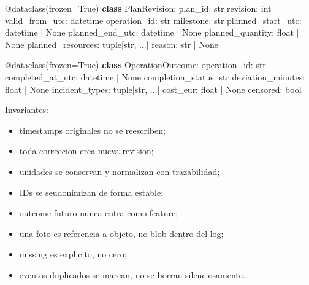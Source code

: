 \documentclass[
  spanish,
  10pt,
  a4paper,
]{article}
\newenvironment{Shaded}{}{}
\newcommand{\AttributeTok}[1]{\textcolor[rgb]{0.49,0.56,0.16}{#1}}
\newcommand{\BuiltInTok}[1]{\textcolor[rgb]{0.00,0.50,0.00}{#1}}
\newcommand{\KeywordTok}[1]{\textcolor[rgb]{0.00,0.44,0.13}{\textbf{#1}}}
\newcommand{\NormalTok}[1]{#1}
\newcommand{\OperatorTok}[1]{\textcolor[rgb]{0.40,0.40,0.40}{#1}}
\newcommand{\VariableTok}[1]{\textcolor[rgb]{0.10,0.09,0.49}{#1}}
\providecommand{\tightlist}{%
  \setlength{\itemsep}{0pt}\setlength{\parskip}{0pt}}
\begin{document}
\begin{Shaded}
\begin{Highlighting}[]
\AttributeTok{@dataclass}\NormalTok{(frozen}\OperatorTok{=}\VariableTok{True}\NormalTok{)}
\KeywordTok{class}\NormalTok{ PlanRevision:}
\NormalTok{    plan\_id: }\BuiltInTok{str}
\NormalTok{    revision: }\BuiltInTok{int}
\NormalTok{    valid\_from\_utc: datetime}
\NormalTok{    operation\_id: }\BuiltInTok{str}
\NormalTok{    milestone: }\BuiltInTok{str}
\NormalTok{    planned\_start\_utc: datetime }\OperatorTok{|} \VariableTok{None}
\NormalTok{    planned\_end\_utc: datetime }\OperatorTok{|} \VariableTok{None}
\NormalTok{    planned\_quantity: }\BuiltInTok{float} \OperatorTok{|} \VariableTok{None}
\NormalTok{    planned\_resources: }\BuiltInTok{tuple}\NormalTok{[}\BuiltInTok{str}\NormalTok{, ...]}
\NormalTok{    reason: }\BuiltInTok{str} \OperatorTok{|} \VariableTok{None}

\AttributeTok{@dataclass}\NormalTok{(frozen}\OperatorTok{=}\VariableTok{True}\NormalTok{)}
\KeywordTok{class}\NormalTok{ OperationOutcome:}
\NormalTok{    operation\_id: }\BuiltInTok{str}
\NormalTok{    completed\_at\_utc: datetime }\OperatorTok{|} \VariableTok{None}
\NormalTok{    completion\_status: }\BuiltInTok{str}
\NormalTok{    deviation\_minutes: }\BuiltInTok{float} \OperatorTok{|} \VariableTok{None}
\NormalTok{    incident\_types: }\BuiltInTok{tuple}\NormalTok{[}\BuiltInTok{str}\NormalTok{, ...]}
\NormalTok{    cost\_eur: }\BuiltInTok{float} \OperatorTok{|} \VariableTok{None}
\NormalTok{    censored: }\BuiltInTok{bool}
\end{Highlighting}
\end{Shaded}

Invariantes:

\begin{itemize}
\tightlist
\item
  timestamps originales no se reescriben;
\item
  toda correccion crea nueva revision;
\item
  unidades se conservan y normalizan con trazabilidad;
\item
  IDs se seudonimizan de forma estable;
\item
  outcome futuro nunca entra como feature;
\item
  una foto es referencia a objeto, no blob dentro del log;
\item
  missing es explicito, no cero;
\item
  eventos duplicados se marcan, no se borran silenciosamente.
\end{itemize}
\end{document}
